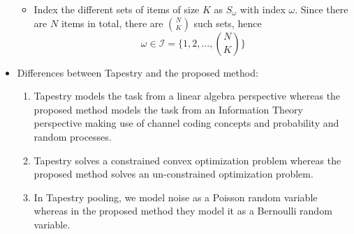 \documentclass[12pt]{article}
\begin{document}
\begin{itemize}
\begin{itemize}
	\item Index the different sets of items of size $K$ as $S_\omega$ with index $\omega$. Since there are $N$ items in total, there are $N \choose K$ such sets, hence
	$$\omega \in \mathcal{I} = \bigg\{1, 2, \ldots, {N\choose K} \bigg\}$$
\end{itemize}
\item Differences between Tapestry and the proposed method:
\begin{enumerate}
\item  Tapestry models the task from a linear algebra perspective whereas the proposed method models the task from an Information Theory perspective making use of channel coding concepts and probability and random processes.
\item Tapestry solves a constrained convex optimization problem whereas the proposed method solves an un-constrained optimization problem.
\item In Tapestry pooling, we model noise as a Poisson random variable whereas in the proposed method they model it as a Bernoulli random variable.
\end{enumerate}
\end{itemize}
\end{document}
